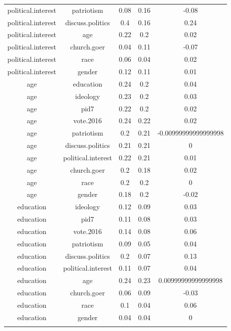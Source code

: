 \begin{longtable}{@{\extracolsep{5pt}} ccccc}
political.interest & patriotism & 0.08 & 0.16 & -0.08 \\ 
political.interest & discuss.politics & 0.4 & 0.16 & 0.24 \\ 
political.interest & age & 0.22 & 0.2 & 0.02 \\ 
political.interest & church.goer & 0.04 & 0.11 & -0.07 \\ 
political.interest & race & 0.06 & 0.04 & 0.02 \\ 
political.interest & gender & 0.12 & 0.11 & 0.01 \\ 
age & education & 0.24 & 0.2 & 0.04 \\ 
age & ideology & 0.23 & 0.2 & 0.03 \\ 
age & pid7 & 0.22 & 0.2 & 0.02 \\ 
age & vote.2016 & 0.24 & 0.22 & 0.02 \\ 
age & patriotism & 0.2 & 0.21 & -0.00999999999999998 \\ 
age & discuss.politics & 0.21 & 0.21 & 0 \\ 
age & political.interest & 0.22 & 0.21 & 0.01 \\ 
age & church.goer & 0.2 & 0.18 & 0.02 \\ 
age & race & 0.2 & 0.2 & 0 \\ 
age & gender & 0.18 & 0.2 & -0.02 \\ 
education & ideology & 0.12 & 0.09 & 0.03 \\ 
education & pid7 & 0.11 & 0.08 & 0.03 \\ 
education & vote.2016 & 0.14 & 0.08 & 0.06 \\ 
education & patriotism & 0.09 & 0.05 & 0.04 \\ 
education & discuss.politics & 0.2 & 0.07 & 0.13 \\ 
education & political.interest & 0.11 & 0.07 & 0.04 \\ 
education & age & 0.24 & 0.23 & 0.00999999999999998 \\ 
education & church.goer & 0.06 & 0.09 & -0.03 \\ 
education & race & 0.1 & 0.04 & 0.06 \\ 
education & gender & 0.04 & 0.04 & 0 \\ 
\hline \\[-1.8ex] 
\end{longtable} 
